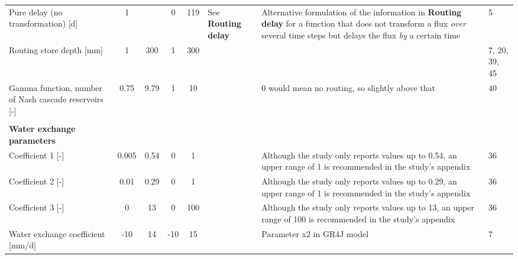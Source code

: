 \begin{longtable}{p{11.215em}ccccp{13em}p{13em}l}
    Pure delay (no transformation) [d] & 1     & \multicolumn{1}{p{3.785em}}{} & 0     & 119   & See \textbf{Routing delay} & Alternative formulation of the information in \textbf{Routing delay} for a function that does not transform a flux \emph{over} several time steps but delays the flux \emph{by} a certain time & \multicolumn{1}{p{10em}}{5} \\
    Routing store depth [mm] & 1     & 300   & 1     & 300   & \cite{Perrin2003} & \multicolumn{1}{l}{} & \multicolumn{1}{p{10em}}{7, 20, 39, 45} \\
    Gamma function, number of Nash cascade reservoirs [-] & 0.75  & 9.79  & 1     & 10    & \cite{Tan1996} & 0 would mean no routing, so slightly above that & 40 \\
    \multicolumn{1}{l}{} &       &       &       &       & \multicolumn{1}{l}{} & \multicolumn{1}{l}{} &  \\

    \textbf{Water exchange parameters} &       &       &       &       & \multicolumn{1}{l}{} & \multicolumn{1}{l}{} &  \\
    Coefficient 1 [-]  & 0.005 & 0.54  & 0     & 1     & \cite{Chiew1994} & Although the study only reports values up to 0.54, an upper range of 1 is recommended in the study's appendix & 36 \\
    Coefficient 2 [-]  & 0.01  & 0.29  & 0     & 1     & \cite{Chiew1994} & Although the study only reports values up to 0.29, an upper range of 1 is recommended in the study's appendix & 36 \\
    Coefficient 3 [-]  & 0     & 13    & 0     & 100   & \cite{Chiew1994} & Although the study only reports values up to 13, an upper range of 100 is recommended in the study's appendix & 36 \\
    Water exchange coefficient [mm/d] & -10   & 14    & -10   & 15    & \cite{Perrin2003,Santos2017} & Parameter x2 in GR4J model & 7 \\
\end{longtable}


\clearpage
{}
\recalctypearea
\pagestyle{fancy}

